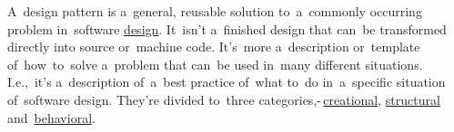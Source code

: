 \label{designpatterns}
A~design pattern is a~general, reusable solution to~a~commonly occurring problem in~software \hyperref[architecturedesign]{design}. It~isn't a~finished design that can~be transformed directly into source or~machine code. It's~more a~description or~template of~how~to~solve a~problem that can~be used in~many different situations. I.e.,~it's a~description of~a~best practice of~what to~do in~a~specific situation of~software design. They're divided to~three categories,\--\,\hyperref[creationaldp]{creational}, \hyperref[structuraldp]{structural} and~\hyperref[behavioraldp]{behavioral}.

\label{creationaldp}

\label{factorydp}

\label{singletondp}

\label{prototypedp}

\label{structuraldp}

\label{proxydp}

\label{behavioraldp}

\label{nulldp}